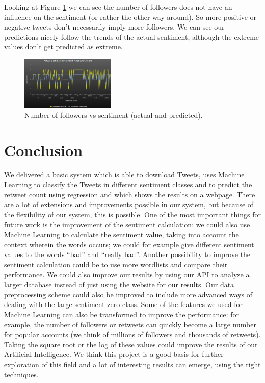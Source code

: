 \documentclass[10pt]{IEEEtran}
\begin{document}
Looking at Figure \ref{result3} we can see the number of followers does not have an influence on the sentiment (or rather the other way around). So more positive or negative tweets don't necessarily imply more followers. We can see our predictions nicely follow the trends of the actual sentiment, although the extreme values don't get predicted as extreme. 

\begin{figure}[h!]
\begin{center}
\includegraphics[width=0.4\textwidth]{images/monitor_maxent_followers_vs_sentiment}
\caption{Number of followers vs sentiment (actual and predicted). \label{result3}}
\end{center}
\end{figure}

\section{Conclusion}

We delivered a basic system which is able to download Tweets, uses Machine Learning to classify the Tweets in different sentiment classes and to predict the retweet count using regression and which shows the results on a webpage. There are a lot of extensions and improvements possible in our system, but because of the flexibility of our system, this is possible. One of the most important things for future work is the improvement of the sentiment calculation: we could also use Machine Learning to calculate the sentiment value, taking into account the context wherein the words occurs; we could for example give different sentiment values to the words ``bad'' and ``really bad''. Another possibility to improve the sentiment calculation could be to use more wordlists and compare their performance. We could also improve our results by using our API to analyze a larger database instead of just using the website for our results. Our data preprocessing scheme could also be improved to include more advanced ways of dealing with the large sentiment zero class. Some of the features we used for Machine Learning can also be transformed to improve the performance: for example, the number of followers or retweets can quickly become a large number for popular accounts (we think of millions of followers and thousands of retweets). Taking the square root or the log of these values could improve the results of our Artificial Intelligence. We think this project is a good basis for further exploration of this field and a lot of interesting results can emerge, using the right techniques. 




\clearpage
\end{document}
